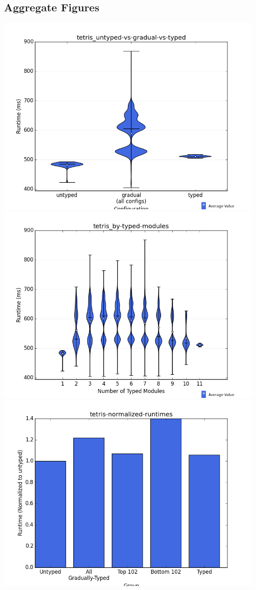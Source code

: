\documentclass{article}
\begin{document}
\subsection{Aggregate Figures}
\includegraphics[width=\textwidth]{tetris_untyped-vs-gradual-vs-typed-violin.png}
\includegraphics[width=\textwidth]{tetris_by-typed-modules-violin.png}
\includegraphics[width=\textwidth]{tetris-normalized-runtimes-bar.png}
\end{document}
